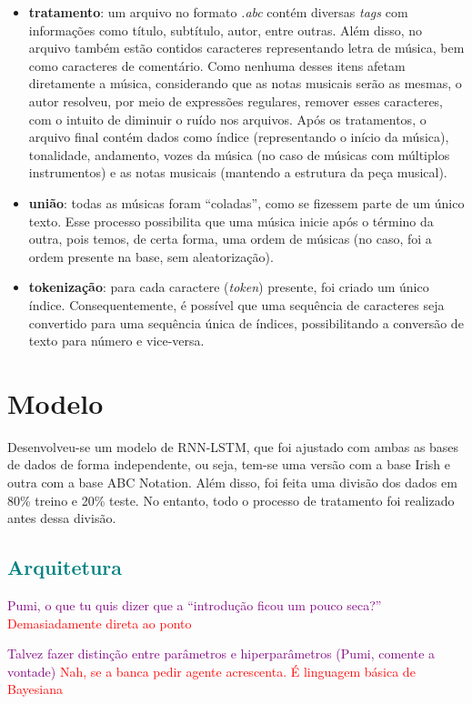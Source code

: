 \documentclass{automatextcc}
\newcommand{\obs}[1]{\textcolor{purple}{#1}}
\newcommand{\nico}[1]{\textcolor{teal}{#1}}
\newcommand{\pumi}[1]{\textcolor{red}{#1}}
\begin{document}
\begin{itemize}
    \item \textbf{tratamento}: um arquivo no formato \textit{.abc} contém diversas \textit{tags} com informações como título, subtítulo, autor, entre outras. Além disso, no arquivo também estão contidos caracteres representando letra de música, bem como caracteres de comentário. Como nenhuma desses itens afetam diretamente a música, considerando que as notas musicais serão as mesmas, o autor resolveu, por meio de expressões regulares, remover esses caracteres, com o intuito de diminuir o ruído nos arquivos. Após os tratamentos, o arquivo final contém dados como índice (representando o início da música), tonalidade, andamento, vozes da música (no caso de músicas com múltiplos instrumentos) e as notas musicais (mantendo a estrutura da peça musical).
    \item \textbf{união}: todas as músicas foram ``coladas'', como se fizessem parte de um único texto. Esse processo possibilita que uma música inicie após o término da outra, pois temos, de certa forma, uma ordem de músicas (no caso, foi a ordem presente na base, sem aleatorização).
    \item \textbf{tokenização}: para cada caractere (\textit{token}) presente, foi criado um único índice. Consequentemente, é possível que uma sequência de caracteres seja convertido para uma sequência única de índices, possibilitando a conversão de texto para número e vice-versa.
\end{itemize}

\section{Modelo}
Desenvolveu-se um modelo de RNN-LSTM, que foi ajustado com ambas as bases de dados de forma independente, ou seja, tem-se uma versão com a base Irish e outra com a base ABC Notation. Além disso, foi feita uma divisão dos dados em 80\% treino e 20\% teste. No entanto, todo o processo de tratamento foi realizado antes dessa divisão.


\subsection{\nico{Arquitetura}}

\obs{Pumi, o que tu quis dizer que a ``introdução ficou um pouco seca?''} \pumi{Demasiadamente direta ao ponto}

\obs{Talvez fazer distinção entre parâmetros e hiperparâmetros (Pumi, comente a vontade) } \pumi{Nah, se a banca pedir agente acrescenta. É linguagem básica de Bayesiana}
\end{document}
